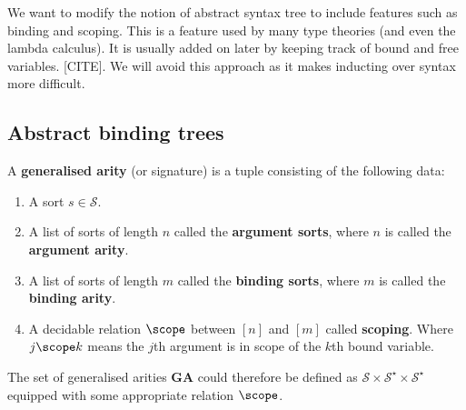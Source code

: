 We want to modify the notion of abstract syntax tree to include features such as binding and scoping. This is a feature used by many type theories (and even the lambda calculus). It is usually added on later by keeping track of bound and free variables. [CITE]. We will avoid this approach as it makes inducting over syntax more difficult.

\subsection{Abstract binding trees}

\begin{defin}
    A \textbf{generalised arity} (or signature) is a tuple consisting of the following data:
    
    \begin{enumerate}
         \parsep
        \item A sort $s \in \mathcal{S}$.
        
        \item A list of sorts of length $n$ called the \textbf{argument sorts}, where $n$ is called the \textbf{argument arity}.
        
        \item A list of sorts of length $m$ called the \textbf{binding sorts}, where $m$ is called the \textbf{binding arity}.
        
        \item A decidable relation $\scope$ between $[n]$ and $[m]$ called \textbf{scoping}. Where $j \scope k$ means the $j$th argument is in scope of the $k$th bound variable.
    \end{enumerate}
    
    The set of generalised arities $\mathbf{GA}$ could therefore be defined as $\mathcal{S} \times \mathcal{S}^\star  \times \mathcal{S}^\star$ equipped with some appropriate relation $\scope$.
\end{defin}


